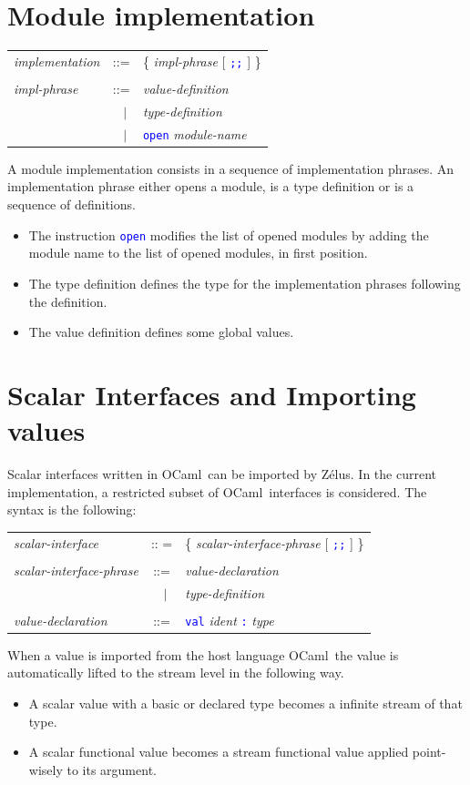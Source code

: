 \documentclass[11pt,titlepage,twoside]{report}
\newcommand{\zelus}{{\sf Z\'elus}}
\newcommand{\ocaml}{{\sf OCaml}}
\newcommand{\alt}{\;|\;}
\newcommand{\Semisemi}{\mbox{{\tt ;;}}}
\newcommand{\term}[1]{\textcolor{Blue}{\tt #1}}
\newcommand{\nterm}[1]{\textcolor{BrickRed}{\it #1}}
\newcommand{\term}[1]{{\tt #1}}
\newcommand{\nterm}[1]{{\em #1}}
\begin{document}
\section{Module implementation\label{moduleimpl}} %
\begin{center}
\begin{tabular}{lcl}
\nterm{implementation}
  & ::=        & \{ \nterm{impl-phrase} [ \term{;;} ] \} 
\\ \\
\nterm{impl-phrase}
  & ::=        & \nterm{value-definition} \\ 
  & $\;\;\alt$ & \nterm{type-definition} \\
  & $\;\;\alt$ & \term{open} \nterm{module-name} 
\end{tabular}
\end{center}
A module implementation consists in a sequence of implementation
phrases. An implementation phrase either opens a module, is a type
definition or is a sequence of definitions.
\begin{itemize}
\item The instruction \term{open} modifies the list of opened modules
  by adding the module name to the list of opened modules, in first
  position.
\item The type definition defines the type for the implementation
  phrases following the definition.
\item The value definition defines some global values.
\end{itemize}

\section{Scalar Interfaces and Importing values\label{importing}} %

Scalar interfaces written in \ocaml\ can be imported by \zelus. In the
current implementation, a restricted subset of \ocaml\ interfaces is
considered. The syntax is the following:
\begin{center}
\begin{tabular}{lcl}
\nterm{scalar-interface}
  & :: =   & \{ \nterm{scalar-interface-phrase} [ \term{\Semisemi} ] \} 
\\ \\
\nterm{scalar-interface-phrase}
  & ::=        & \nterm{value-declaration} \\
  & $\;\;\alt$ & \nterm{type-definition}
\\ \\
\nterm{value-declaration}
  & ::=        & \term{val} \nterm{ident} \term{:} \nterm{type}
\end{tabular}
\end{center}
When a value is imported from the host language \ocaml\ the
value is automatically lifted to the stream level in the following way.
\begin{itemize}
\item A scalar value with a basic or declared type becomes a infinite
  stream of that type.
\item A scalar functional value becomes a stream functional value
  applied point-wisely to its argument.
\end{itemize}
\end{document}
